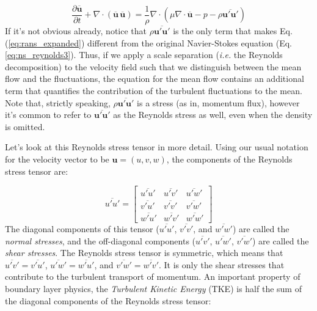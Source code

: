 \documentclass[12pt]{article}
\numberwithin{equation}{section}
\numberwithin{figure}{section}
\numberwithin{table}{section}
\begin{document}
\begin{equation}
  \frac{\partial \overline{\mathbf{u}}}{\partial t} +
  \nabla \cdot (\overline{\mathbf{u}}\, \overline{\mathbf{u}}) =
  \frac{1}{\rho} \nabla \cdot \left( \mu \nabla \cdot \overline{\mathbf{u}} - p - \rho \overline{\mathbf{u}' \mathbf{u}'} \right)
  \label{eq:rans_expanded}
\end{equation}
If it's not obvious already, notice that $\rho \overline{\mathbf{u}' \mathbf{u}'}$
is the only term that makes Eq. (\ref{eq:rans_expanded}) different from the
original Navier-Stokes equation (Eq. \ref{eq:ns_reynolds3}).
Thus, if we apply a scale separation (\textit{i.e.} the Reynolds decomposition)
to the velocity field such that we distinguish between the mean flow and the
fluctuations, the equation for the mean flow contains an additional term that
quantifies the contribution of the turbulent fluctuations to the mean.
Note that, strictly speaking, $\rho \overline{\mathbf{u}' \mathbf{u}'}$ is a
stress (as in, momentum flux), however it's common to refer to
$\overline{\mathbf{u}' \mathbf{u}'}$ as the Reynolds stress as well, even when
the density is omitted.

Let's look at this Reynolds stress tensor in more detail.
Using our usual notation for the velocity vector to be $\mathbf{u} = (u, v, w)$,
the components of the Reynolds stress tensor are:

\begin{equation}
  \overline{u'u'} = \begin{bmatrix}
    \overline{u'u'} & \overline{u'v'} & \overline{u'w'} \\
    \overline{v'u'} & \overline{v'v'} & \overline{v'w'} \\
    \overline{w'u'} & \overline{w'v'} & \overline{w'w'}
  \end{bmatrix}
\end{equation}
The diagonal components of this tensor ($\overline{u'u'}$, $\overline{v'v'}$, and
$\overline{w'w'}$) are called the \textit{normal stresses}, and the off-diagonal
components ($\overline{u'v'}$, $\overline{u'w'}$, $\overline{v'w'}$) are called
the \textit{shear stresses}.
The Reynolds stress tensor is symmetric, which means that
$\overline{u'v'} = \overline{v'u'}$, $\overline{u'w'} = \overline{w'u'}$, and
$\overline{v'w'} = \overline{w'v'}$.
It is only the shear stresses that contribute to the turbulent transport of
momentum.
An important property of boundary layer physics, the
\textit{Turbulent Kinetic Energy} (TKE) is half
the sum of the diagonal components of the Reynolds stress tensor:
\end{document}
